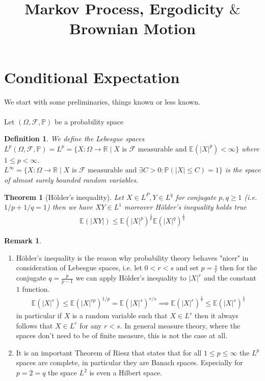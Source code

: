 \documentclass[11pt,a4paper, final]{article}
\title{Markov Process, Ergodicity $\&$ Brownian Motion}
\newtheorem{thm}{Theorem}[section]
\newtheorem{defn}{Definition}[section]
\theoremstyle{definition}
\newtheorem{rem}{Remark}[section]
\begin{document}
\maketitle
\thispagestyle{empty}
\tableofcontents
\newpage
\section{Conditional Expectation}
We start with some preliminaries, things known or less known.
\\\\
Let $( \Omega, \mathcal{F}, \mathbb{P})$ be a probability space
\begin{defn} We define the Lebesgue spaces \\ $L^p(\Omega, \mathcal{F}, \mathbb{P})=L^p= \lbrace X: \Omega \to \mathbb{R} \mid X \text{ is $\mathcal{F}$  measurable and } \mathbb{E}(|X|^p) < \infty \rbrace$ where $1 \leq p < \infty$. \\
$L^\infty = \lbrace X : \Omega \to \mathbb{R} \mid X \text{ is $\mathcal{F}$ measurable and } \exists C>0 : \mathbb{P}(|X| \leq C) = 1  \rbrace  $ is the space of almost surely bounded random variables. 
\end{defn}
\begin{thm}[Hölder's inequality] Let $X \in L^P, Y \in L^q$ for conjugate $p,q \geq 1$ (i.e. $1/p + 1/q = 1$) then we have $XY \in L^1$ moreover Hölder's inequality holds true
\begin{align*}
\mathbb{E}(|XY|) \leq \mathbb{E}(|X|^p)^{\frac{1}{p}} \mathbb{E}(|X|^q)^{\frac{1}{q}}
\end{align*}
\end{thm}
\begin{rem} \ \begin{enumerate}
\item Hölder's inequality is the reason why probability theory behaves "nicer" in consideration of Lebesgue spaces, i.e. let $0<r<s$ and set $p= \frac{s}{r}$ then for the conjugate $q=\frac{p}{p-1}$ we can apply Hölder's inequality to $|X|^r$ and the constant $1$ function. 
\begin{align*}
\mathbb{E}(|X|^r) \leq \mathbb{E}(|X|^{rp})^{1/p} = \mathbb{E}(|X|^s)^{r/s} \implies \mathbb{E}(|X|^r)^{\frac{1}{r}} \leq \mathbb{E}(|X|^s)^{\frac{1}{s}} 
\end{align*}
in particular if $X$ is a random variable such that $X \in L^s$ then it always follows that $X \in L^r$ for any $r <s$. In general measure theory, where the spaces don't need to be of finite measure, this is not the case at all. 
\item It is an important Theorem of Riesz that states that for all $1 \leq p \leq \infty$ the $L^p$ spaces are complete, in particular they are Banach spaces. Especially for $p=2=q$ the space $L^2$ is even a Hilbert space. 
\end{enumerate}
\end{rem}
\end{document}
